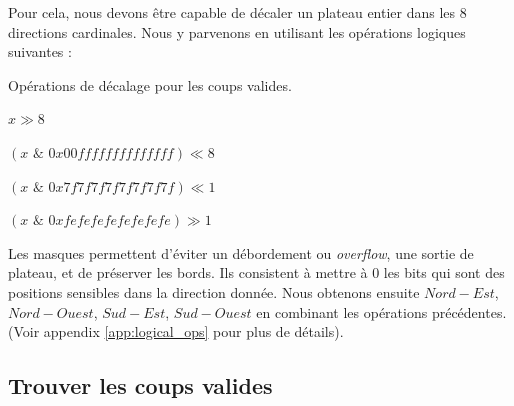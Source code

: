 Pour cela, nous devons être capable de décaler un plateau entier dans les 8 directions cardinales. Nous y parvenons en utilisant les opérations logiques suivantes :
\begin{algorithm}
    \caption{Opérations de décalage pour les coups valides.}
    \begin{algorithmic}[1]
        \State \Return $x \gg 8$
    \EndFunction
    
        \State \Return $(x \,\, \& \,\, 0x00ffffffffffffff) \ll 8$
    \EndFunction
    
        \State \Return $(x \,\, \& \,\, 0x7f7f7f7f7f7f7f7f) \ll 1$
    \EndFunction
    
        \State \Return $(x \,\, \& \,\, 0xfefefefefefefefe) \gg 1$
    \EndFunction
    \end{algorithmic}
    \label{alg:shift_ops}
\end{algorithm}

Les masques permettent d'éviter un débordement ou \textit{overflow}, une sortie de plateau, et de préserver les bords. Ils consistent à mettre à 0 les bits qui sont des positions sensibles dans la direction donnée. Nous obtenons ensuite $Nord-Est$, $Nord-Ouest$, $Sud-Est$, $Sud-Ouest$ en combinant les opérations précédentes. (Voir appendix \ref{app:logical_ops} pour plus de détails).

\subsection{Trouver les coups valides}
\label{subsec:valid_moves}

